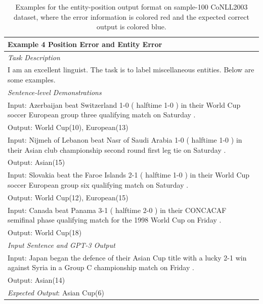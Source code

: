 \documentclass{article}
\begin{document}
\begin{table}[th!]
{\begin{tabular}{l}
\textbf{Example 4 {\color{red} Position Error and Entity Error}} \\\midrule
       	\textit{Task Description} \\
I am an excellent linguist. The task is to label miscellaneous entities. Below are some examples. \\
\textit{Sentence-level Demonstrations} \\
Input: Azerbaijan beat Switzerland 1-0 ( halftime 1-0 ) in their World Cup soccer European group three qualifying match on Saturday . \\
Output: World Cup(10), European(13) \\
Input: Nijmeh of Lebanon beat Nasr of Saudi Arabia 1-0 ( halftime 1-0 ) in their Asian club championship second round first leg tie on Saturday . \\
Output: Asian(15) \\
Input: Slovakia beat the Faroe Islands 2-1 ( halftime 1-0 ) in their World Cup soccer European group six qualifying match on Saturday . \\
Output: World Cup(12), European(15) \\
Input: Canada beat Panama 3-1 ( halftime 2-0 ) in their CONCACAF semifinal phase qualifying match for the 1998 World Cup on Friday . \\
Output: World Cup(18) \\\midrule
\textit{Input Sentence and GPT-3 Output} \\
Input: Japan began the defence of their Asian Cup title with a lucky 2-1 win against Syria in a Group C championship match on Friday . \\
Output: Asian(14) \\
{\color{blue}\it Expected Output}: Asian Cup(6) \\\bottomrule
    \end{tabular}
    }
     \caption{Examples for the entity-position output format on sample-100 CoNLL2003 dataset, where the error information is colored red and the expected correct output is colored blue.}
    \label{tab:entity_position_format}
\end{table}
\end{document}
